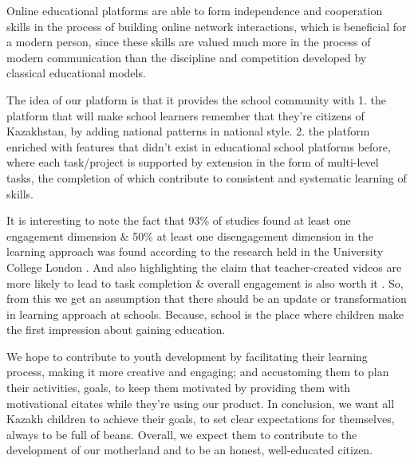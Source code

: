 Online educational platforms are able to form independence and cooperation skills in the process of building online network interactions, which is beneficial for a modern person, since these skills are valued much more in the process of modern communication than the discipline and competition developed by classical educational models. 

The idea of our platform is that it provides the school community with 
1. the platform that will make school learners remember that they're citizens of Kazakhstan, by adding national patterns in national style.
2. the platform enriched with features that didn't exist in educational school platforms before, where each task/project is supported by extension in the form of multi-level tasks, the completion of which contribute to consistent and systematic learning of skills. 

It is interesting to note the fact that 93\% of studies found at least one engagement dimension \& 50\% at least one disengagement dimension in the learning approach was found according to the research held in the University College London \cite{bond2020facilitating}. And also highlighting the claim that teacher-created videos are more likely to lead to task completion & overall engagement is also worth it \cite{bond2020facilitating}. So, from this we get an  assumption that there should be an update or transformation in learning approach at schools. Because, school is the place where children make the first impression about gaining education.  

We hope to contribute to youth development by facilitating their learning process, making it more creative and engaging; and accustoming them to plan their activities, goals, to keep them motivated by providing them with motivational citates while they're using our product. In conclusion, we want all Kazakh children to achieve their goals, to set clear expectations for themselves, always to be full of beans. Overall, we expect them to contribute to the development of our motherland and to be an honest, well-educated citizen. 

